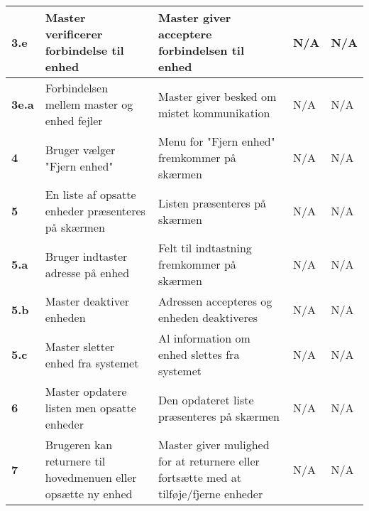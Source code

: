 \begin{center}
\begin{longtable}{|p{}|p{}|p{}|p{}|p{}|}
\textbf{3.e}&Master verificerer forbindelse til enhed 
			&Master giver acceptere forbindelsen til enhed 
			&N/A 
			&N/A \\\hline 
			
\textbf{3e.a}&Forbindelsen mellem master og enhed fejler
			&Master giver besked om mistet kommunikation
			&N/A 
			&N/A \\\hline
			
\textbf{4}	&Bruger vælger "Fjern enhed" 
			&Menu for "Fjern enhed" fremkommer på skærmen 
			&N/A 
			&N/A \\\hline
			 
\textbf{5}	&En liste af opsatte enheder præsenteres på skærmen 
			&Listen præsenteres på skærmen 
			&N/A 
			&N/A \\\hline
			 
\textbf{5.a}&Bruger indtaster adresse på enhed 
			&Felt til indtastning fremkommer på skærmen 
			&N/A 
			&N/A \\\hline
			 
\textbf{5.b}&Master deaktiver enheden 
			&Adressen accepteres og enheden deaktiveres
			&N/A 
			&N/A \\\hline
			
\textbf{5.c}&Master sletter enhed fra systemet 
			&Al information om enhed slettes fra systemet 
			&N/A 
			&N/A \\\hline
			 
\textbf{6}	&Master opdatere listen men opsatte enheder 
			&Den opdateret liste præsenteres på skærmen 
			&N/A 
			&N/A \\\hline
			 
\textbf{7}	&Brugeren kan returnere til hovedmenuen eller opsætte ny enhed 
			&Master giver mulighed for at returnere eller fortsætte med at tilføje/fjerne enheder 
			&N/A
			&N/A \\\hline

\end{longtable}
	\label{ATUC1} 
\end{center}